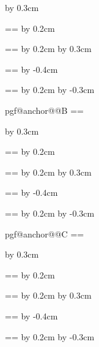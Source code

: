 {{    \advance\pgf@xa by 0.3cm
    \pgfpathlineto{\pgfpoint{\pgf@xa}{\pgf@ya}}
    
    \pgf@xb=\pgf@xa \pgf@yb=\pgf@ya
    \advance\pgf@yb by 0.2cm
    \pgfpathlineto{\pgfpoint{\pgf@xb}{\pgf@yb}}
    
    \pgf@xc=\pgf@xb \pgf@yc=\pgf@yb
    \advance\pgf@xc by 0.2cm
    \advance\pgf@yc by 0.3cm
    \pgfpathlineto{\pgfpoint{\pgf@xc}{\pgf@yc}}

    \pgf@xa=\pgf@xc \pgf@ya=\pgf@yc
    \advance\pgf@xa by -0.4cm
    \pgfpathlineto{\pgfpoint{\pgf@xa}{\pgf@ya}}
    
    \pgf@xb=\pgf@xa \pgf@yb=\pgf@ya
    \advance\pgf@xb by 0.2cm
    \advance\pgf@yb by -0.3cm
    \pgfpathlineto{\pgfpoint{\pgf@xb}{\pgf@yb}}


    \csname pgf@anchor@\shape@name @B\endcsname
    \pgf@xa=\pgf@x \pgf@ya=\pgf@y
    \pgfpathmoveto{\pgfpoint{\pgf@x}{\pgf@y}}

    \advance\pgf@xa by 0.3cm
    \pgfpathlineto{\pgfpoint{\pgf@xa}{\pgf@ya}}
    
    \pgf@xb=\pgf@xa \pgf@yb=\pgf@ya
    \advance\pgf@yb by 0.2cm
    \pgfpathlineto{\pgfpoint{\pgf@xb}{\pgf@yb}}
    
    \pgf@xc=\pgf@xb \pgf@yc=\pgf@yb
    \advance\pgf@xc by 0.2cm
    \advance\pgf@yc by 0.3cm
    \pgfpathlineto{\pgfpoint{\pgf@xc}{\pgf@yc}}

    \pgf@xa=\pgf@xc \pgf@ya=\pgf@yc
    \advance\pgf@xa by -0.4cm
    \pgfpathlineto{\pgfpoint{\pgf@xa}{\pgf@ya}}
    
    \pgf@xb=\pgf@xa \pgf@yb=\pgf@ya
    \advance\pgf@xb by 0.2cm
    \advance\pgf@yb by -0.3cm
    \pgfpathlineto{\pgfpoint{\pgf@xb}{\pgf@yb}}
    

    \csname pgf@anchor@\shape@name @C\endcsname
    \pgf@xa=\pgf@x \pgf@ya=\pgf@y
    \pgfpathmoveto{\pgfpoint{\pgf@x}{\pgf@y}}

    \advance\pgf@xa by 0.3cm
    \pgfpathlineto{\pgfpoint{\pgf@xa}{\pgf@ya}}
    
    \pgf@xb=\pgf@xa \pgf@yb=\pgf@ya
    \advance\pgf@yb by 0.2cm
    \pgfpathlineto{\pgfpoint{\pgf@xb}{\pgf@yb}}
    
    \pgf@xc=\pgf@xb \pgf@yc=\pgf@yb
    \advance\pgf@xc by 0.2cm
    \advance\pgf@yc by 0.3cm
    \pgfpathlineto{\pgfpoint{\pgf@xc}{\pgf@yc}}

    \pgf@xa=\pgf@xc \pgf@ya=\pgf@yc
    \advance\pgf@xa by -0.4cm
    \pgfpathlineto{\pgfpoint{\pgf@xa}{\pgf@ya}}
    
    \pgf@xb=\pgf@xa \pgf@yb=\pgf@ya
    \advance\pgf@xb by 0.2cm
    \advance\pgf@yb by -0.3cm
    \pgfpathlineto{\pgfpoint{\pgf@xb}{\pgf@yb}}
  }
}


